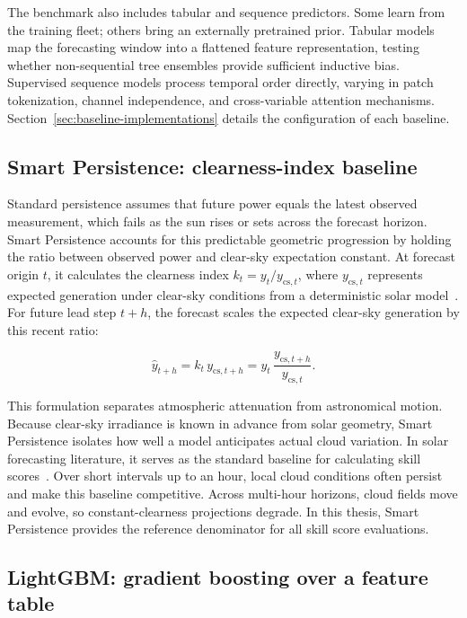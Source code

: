 The benchmark also includes tabular and sequence predictors. Some learn from the training fleet; others bring an externally pretrained prior. Tabular models map the forecasting window into a flattened feature representation, testing whether non-sequential tree ensembles provide sufficient inductive bias. Supervised sequence models process temporal order directly, varying in patch tokenization, channel independence, and cross-variable attention mechanisms. Section~\ref{sec:baseline-implementations} details the configuration of each baseline.

\subsection{Smart Persistence: clearness-index baseline}
\label{sec:rw-smart-persistence}

Standard persistence assumes that future power equals the latest observed measurement, which fails as the sun rises or sets across the forecast horizon. Smart Persistence accounts for this predictable geometric progression by holding the ratio between observed power and clear-sky expectation constant. At forecast origin $t$, it calculates the clearness index $k_t = y_t / y_{\mathrm{cs},t}$, where $y_{\mathrm{cs},t}$ represents expected generation under clear-sky conditions from a deterministic solar model~\cite{haurwitz}. For future lead step $t+h$, the forecast scales the expected clear-sky generation by this recent ratio:

\[
\hat{y}_{t+h} = k_t \, y_{\mathrm{cs},t+h} = y_t \, \frac{y_{\mathrm{cs},t+h}}{y_{\mathrm{cs},t}}.
\]

This formulation separates atmospheric attenuation from astronomical motion. Because clear-sky irradiance is known in advance from solar geometry, Smart Persistence isolates how well a model anticipates actual cloud variation. In solar forecasting literature, it serves as the standard baseline for calculating skill scores~\cite{singh2026pvforecastreview}. Over short intervals up to an hour, local cloud conditions often persist and make this baseline competitive. Across multi-hour horizons, cloud fields move and evolve, so constant-clearness projections degrade. In this thesis, Smart Persistence provides the reference denominator for all skill score evaluations.

\subsection{LightGBM: gradient boosting over a feature table}
\label{sec:rw-lightgbm}


